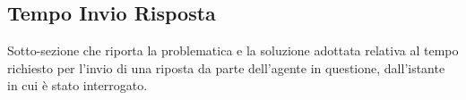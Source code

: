 \subsection{Tempo Invio Risposta}

Sotto-sezione che riporta la problematica e la soluzione adottata relativa al tempo richiesto per l'invio di una riposta da parte dell'agente in questione, dall'istante in cui è stato interrogato.
